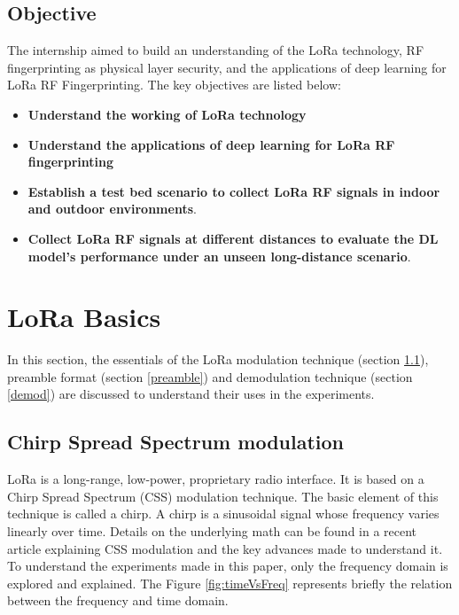 \documentclass[a4paper, 12pt]{article}
\begin{document}
\subsection{Objective}

The internship aimed to build an understanding of the LoRa technology, RF fingerprinting as physical layer security, and the applications of deep learning for LoRa RF Fingerprinting.  The key objectives are listed below:

\begin{itemize}
    \item \textbf{Understand the working of LoRa technology}
    \item \textbf{Understand the applications of deep learning for LoRa RF fingerprinting}
    \item \textbf{Establish a test bed scenario to collect LoRa RF signals in indoor and outdoor environments}.
    \item \textbf{Collect LoRa RF signals at different distances to evaluate the DL model's performance under an unseen long-distance scenario}.
\end{itemize}


\section{LoRa Basics}\label{LoraBasics}  

In this section, the essentials of the LoRa modulation technique (section \ref{CSS}), preamble format (section \ref{preamble}) and demodulation technique (section \ref{demod}) are discussed to understand their uses in the experiments.

\subsection{Chirp Spread Spectrum modulation}\label{CSS}

LoRa is a long-range, low-power, proprietary radio interface.
It is based on a Chirp Spread Spectrum (CSS) modulation technique. 
The basic element of this technique is called a chirp. 
A chirp is a sinusoidal signal whose frequency varies linearly over time. 
Details on the underlying math can be found in a recent article \cite{CSSTuto} explaining CSS modulation and the key advances made to understand it.
To understand the experiments made in this paper, only the frequency domain is explored and explained. The Figure \ref{fig:timeVsFreq} represents briefly the relation between the frequency and time domain. 
\end{document}
